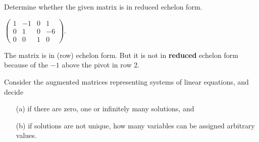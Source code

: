 \documentclass{ximera}
\begin{document}
\problemlabel

\noindent Determine whether the given matrix is in reduced echelon form.

\begin{exercise} \label{c2.3.6a}
$\left(\begin{array}{rrrr}
1 & -1 &  0 &   1   \\
0 &  1 &  0 &  -6    \\
         0 &  0 &  1 &   0   \end{array}\right)$.
     \begin{multipleChoice}
     \end{multipleChoice}

\begin{feedback}
The matrix is in (row) echelon form.  But it is not in \textbf{reduced} echelon form because of the $-1$ above the pivot in row 2. 

\end{feedback}
\end{exercise}



\problemlabel

\noindent Consider the augmented matrices representing systems of linear equations, and decide \begin{itemize} \item[(a)] if there are zero, one or infinitely many solutions, and \item[(b)] if solutions are not unique, how many variables can be assigned arbitrary values. \end{itemize}
\end{document}

